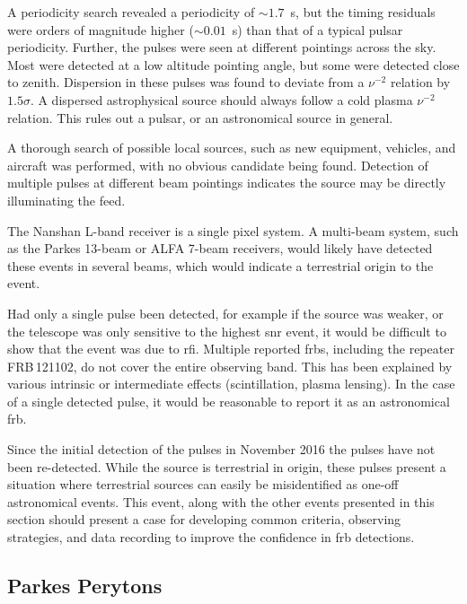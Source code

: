 \documentclass[a4paper,fleqn,usenatbib]{mnras}
\begin{document}
A periodicity search revealed a periodicity of $\sim 1.7$~s, but the timing
residuals were orders of magnitude higher \mbox{($\sim 0.01$~s)} than that of a
typical pulsar periodicity. Further, the pulses were seen at different pointings
across the sky.  Most were detected at a low altitude pointing angle, but some
were detected close to zenith.  Dispersion in these pulses was found to deviate
from a $\nu^{-2}$ relation by $1.5 \sigma$. A dispersed astrophysical source
should always follow a cold plasma $\nu^{-2}$ relation.  This rules out a
pulsar, or an astronomical source in general.

A thorough search of possible local sources, such as new equipment, vehicles,
and aircraft was performed, with no obvious candidate being found. Detection of
multiple pulses at different beam pointings indicates the source may be directly
illuminating the feed.

The Nanshan L-band receiver is a single pixel system. A multi-beam system, such
as the Parkes 13-beam or ALFA 7-beam receivers, would likely have detected these
events in several beams, which would indicate a terrestrial origin to the event.

Had only a single pulse been detected, for example if the source was weaker, or
the telescope was only sensitive to the highest \gls{snr} event, it would be
difficult to show that the event was due to \gls{rfi}.  Multiple reported
\glspl{frb}, including the repeater FRB\,121102, do not cover the entire observing
band. This has been explained by various intrinsic or intermediate effects
(scintillation, plasma lensing). In the case of a single detected pulse, it would
be reasonable to report it as an astronomical \gls{frb}.

Since the initial detection of the pulses in November 2016 the pulses have not
been re-detected. While the source is terrestrial in origin, these pulses
present a situation where terrestrial sources can easily be misidentified as
one-off astronomical events. This event, along with the other events presented
in this section should present a case for developing common criteria, observing
strategies, and data recording to improve the confidence in \gls{frb}
detections.

\subsection{Parkes Perytons}
\label{sec:perytons}
\end{document}
